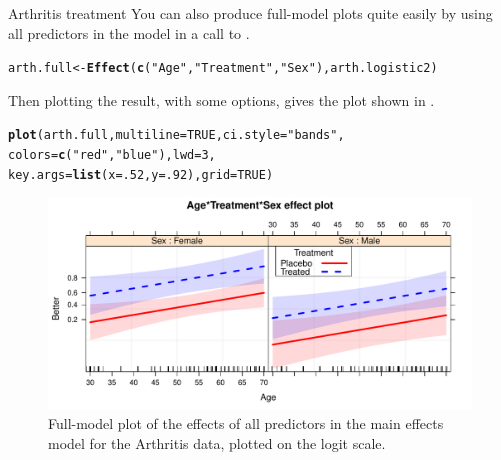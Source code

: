 \documentclass[11pt]{book}\usepackage[]{graphicx}\usepackage[]{color}
\makeatletter
\newcommand{\hlnum}[1]{\textcolor[rgb]{0.686,0.059,0.569}{#1}}%
\newcommand{\hlstr}[1]{\textcolor[rgb]{0.192,0.494,0.8}{#1}}%
\newcommand{\hlstd}[1]{\textcolor[rgb]{0.345,0.345,0.345}{#1}}%
\newcommand{\hlkwb}[1]{\textcolor[rgb]{0.69,0.353,0.396}{#1}}%
\newcommand{\hlkwc}[1]{\textcolor[rgb]{0.333,0.667,0.333}{#1}}%
\newcommand{\hlkwd}[1]{\textcolor[rgb]{0.737,0.353,0.396}{\textbf{#1}}}%
\newenvironment{kframe}{%
 \def\at@end@of@kframe{}%
 \ifinner\ifhmode%
  \def\at@end@of@kframe{\end{minipage}}%
  \begin{minipage}{\columnwidth}%
 \fi\fi%
 \def\FrameCommand##1{\hskip\@totalleftmargin \hskip-\fboxsep
 \colorbox{shadecolor}{##1}\hskip-\fboxsep
     \hskip-\linewidth \hskip-\@totalleftmargin \hskip\columnwidth}%
 \MakeFramed {\advance\hsize-\width
   \@totalleftmargin\z@ \linewidth\hsize
   \@setminipage}}%
 {\par\unskip\endMakeFramed%
 \at@end@of@kframe}
\newenvironment{knitrout}{}{} %
\renewenvironment{knitrout}{\small\renewcommand{\baselinestretch}{.85}}{} %
\makeatother
\begin{document}
\begin{Example}{Arthritis treatment}
You can also produce full-model plots quite easily by using all predictors in the model
in a call to .
\begin{knitrout}
\color{fgcolor}\begin{kframe}
\begin{alltt}
\hlstd{arth.full} \hlkwb{<-} \hlkwd{Effect}\hlstd{(}\hlkwd{c}\hlstd{(}\hlstr{"Age"}\hlstd{,} \hlstr{"Treatment"}\hlstd{,} \hlstr{"Sex"}\hlstd{), arth.logistic2)}
\end{alltt}
\end{kframe}
\end{knitrout}
Then plotting the result, with some options, gives the plot shown in .
\begin{knitrout}
\color{fgcolor}\begin{kframe}
\begin{alltt}
\hlkwd{plot}\hlstd{(arth.full,} \hlkwc{multiline}\hlstd{=}\hlnum{TRUE}\hlstd{,} \hlkwc{ci.style}\hlstd{=}\hlstr{"bands"}\hlstd{,}
     \hlkwc{colors} \hlstd{=} \hlkwd{c}\hlstd{(}\hlstr{"red"}\hlstd{,} \hlstr{"blue"}\hlstd{),} \hlkwc{lwd}\hlstd{=}\hlnum{3}\hlstd{,}
     \hlkwc{key.args}\hlstd{=}\hlkwd{list}\hlstd{(}\hlkwc{x}\hlstd{=}\hlnum{.52}\hlstd{,} \hlkwc{y}\hlstd{=}\hlnum{.92}\hlstd{),} \hlkwc{grid}\hlstd{=}\hlnum{TRUE}\hlstd{)}
\end{alltt}
\end{kframe}\begin{figure}[!htbp]


\centerline{\includegraphics[width=.8\textwidth]{ch07/fig/arth-effplot2-1} }

\caption[Full-model plot of the effects of all predictors in the main effects model for the Arthritis data, plotted on the logit scale]{Full-model plot of the effects of all predictors in the main effects model for the Arthritis data, plotted on the logit scale.\label{fig:arth-effplot2}}
\end{figure}



\end{knitrout}
\end{Example}
\end{document}
